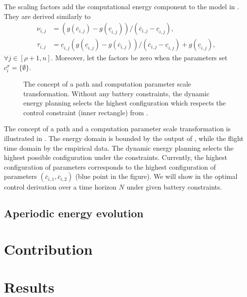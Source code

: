 The scaling factors add the computational energy component to the model in . They are derived similarly to 
\begin{subequations}\label{eq:scale-comp}\begin{align}
  \nu_{i,j}&=(g(\overline{c}_{i,j})-g(\underline{c}_{i,j}))/(\overline{c}_{i,j}-\underline{c}_{i,j}),\\
  \tau_{i,j}&=\underline{c}_{i,j}(g(\underline{c}_{i,j})-g(\overline{c}_{i,j}))/(\overline{c}_{i,j}-\underline{c}_{i,j})+g(\underline{c}_{i,j}),
\end{align}\end{subequations}
$\forall j\in[\rho+1,n]$. Moreover, let the factors be zero when the parameters set $c_i^\sigma=\{\emptyset\}$.

\begin{figure}[h]
  \centering
  \selectfont
  
  \caption[Concept of a path and computation parameter scale transformation]{The concept of a path and computation parameter scale transformation. Without any battery constraints, the dynamic energy planning selects the highest configuration which respects the control constraint (inner rectangle) from .}
  \label{fig:plot-6}
\end{figure}

The concept of a path and a computation parameter scale transformation is illustrated in . The energy domain is bounded by the output of \powprof{}, while the flight time domain by the empirical data. The dynamic energy planning selects the highest possible configuration under the constraints. Currently, the highest configuration of parameters corresponds to the highest configuration of parameters $(\overline{c}_{i,1},\overline{c}_{i,2})$ (blue point in the figure). We will show in  the optimal control derivation over a time horizon $N$ under given battery constraints. 

\subsection{\color{red}Aperiodic energy evolution}
\label{sec:non-perio}

\section{\color{red}Contribution}


\section{\color{cyan}Results}

